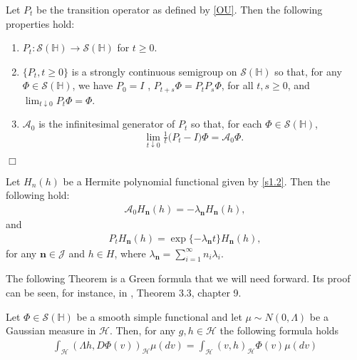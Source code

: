\documentclass[review, onefignum, onetabnum]{siamart171218}
\begin{document}
\begin{lemma}
    Let $P_t$ be the transition operator as defined by \eqref{OU}. Then
    the following properties hold:
    \begin{enumerate}
     \item  
        $P_t : \mathcal{S}(\mathbb{H})\rightarrow  \mathcal{S}(\mathbb{H})$  
        for $t \ge 0$.
    \item 
        $\{P_t , t \ge 0\}$ 
        is a strongly continuous semigroup on 
        $\mathcal{S}(\mathbb{H})$ so that, for any
        $\Phi \in \mathcal{S}(\mathbb{H})$, we have $P_0 = I$ , 
        $P_{t+s} \Phi = P_t P_s \Phi$, for all $t, s \ge 0$, and 
        $\lim_{t\downarrow 0}
        P_t \Phi = \Phi$.
    \item 
        $\mathcal{A}_0$ is the infinitesimal generator of $P_t$ so that, for 
        each $\Phi\in\mathcal{S}(\mathbb{H})$,
        \[
            \lim_{t\downarrow 0} \tfrac{1}{t}\big(P_t- I\big)\Phi
                = \mathcal{A}_0\Phi.
        \]
    \end{enumerate}
    \hfill $\Box$
\end{lemma}

\begin{lemma}\label{Pt-Her} 
        Let $H_n(h)$ be a Hermite polynomial functional given by \eqref{s1.2}. 
        Then the following hold:
    \begin{align}
        \mathcal{A}_0 H_{\mathbf{n}}(h) = 
        -\lambda_{\mathbf{n}} H_{\mathbf{n}}(h),
    \end{align}
    and
    \begin{align}
        P_t H_{\mathbf{n}} (h) 
        = \exp\{-\lambda_{\mathbf{n}} t\} H_{\mathbf{n}} (h),
    \end{align}
    for any $\mathbf{n}\in\mathcal{J}$ and $h \in H$, where
    $
        \displaystyle
        \lambda_{\mathbf{n}}=\sum_{i=1}^\infty n_i\lambda_i.
    $
    
\end{lemma}

The following Theorem is a Green formula that we will need forward. 
Its proof can be seen, for instance, in \cite{liu}, Theorem 3.3, chapter 9.

\begin{theorem}\label{green-form}
    Let 
    $
        \Phi \in \mathcal{S}(\mathbb{H})
    $ be a smooth simple functional and let 
    $\mu\sim N(0,\Lambda)$ be a Gaussian measure in $\mathcal{H}$. Then, 
    for any $g,h\in\mathcal{H}$ the following formula holds
    \begin{align}
        \int_{\mathcal{H}} (\Lambda h,D\Phi(v))_{\mathcal{H}}  \mu(dv) = 
            \int_{\mathcal{H}} (v,h)_{\mathcal{H}} 
            \Phi(v) \mu(dv) 
            \label{s2.2.1}
    \end{align}
    
\end{theorem}
\end{document}
